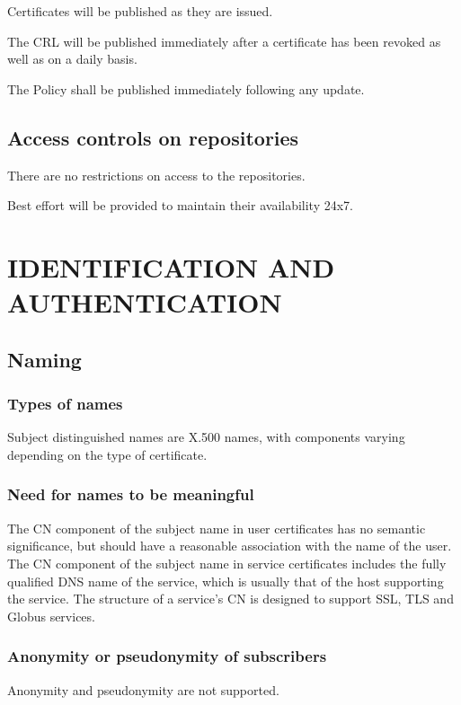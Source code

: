 \documentclass[10pt]{article}
\begin{document}
Certificates will be published as they are issued.

The CRL will be published immediately after a certificate has been
revoked as well as on a daily basis.

The Policy shall be published immediately following any update.

\subsection{Access controls on repositories}

There are no restrictions on access to the repositories.

Best effort will be provided to maintain their availability 24x7.

\section{IDENTIFICATION AND AUTHENTICATION}
\subsection{Naming}
\subsubsection{Types of names}

Subject distinguished names are X.500 names, with components varying
depending on the type of certificate.

\subsubsection{Need for names to be meaningful}

The CN component of the subject name in user certificates has no
semantic significance, but should have a reasonable association with
the name of the user. The CN component of the subject name in service
certificates includes the fully qualified DNS name of the service,
which is usually that of the host supporting the service. The
structure of a service’s CN is designed to support SSL, TLS and Globus
services.

\subsubsection{Anonymity or pseudonymity of subscribers}

Anonymity and pseudonymity are not supported.
\end{document}
